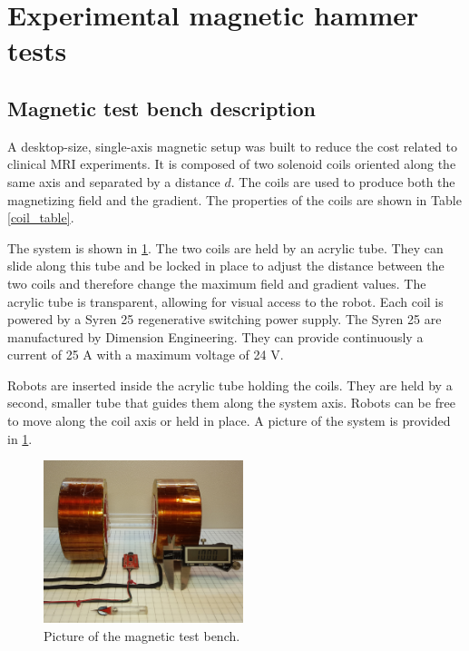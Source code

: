 \documentclass[letterpaper, 10 pt, conference]{ieeeconf}  %
\begin{document}
\section{Experimental magnetic hammer tests}
\label{experiment}
\subsection{Magnetic test bench description}

A desktop-size, single-axis magnetic setup was built to reduce the cost related to clinical MRI experiments.
 It is composed of two solenoid coils oriented along the same axis and separated by a distance $d$. 
 The coils are used to produce both the magnetizing field and the gradient. 
 The properties of the coils are shown in Table \ref{coil_table}.\par
The system is shown in \cref{magnetic_setup}.
 The two coils are held by an acrylic tube. 
 They can slide along this tube and be locked in place to adjust the distance between the two coils and therefore change the maximum field and gradient values. 
 The acrylic tube is transparent, allowing for visual access to the robot.
Each coil is powered by a Syren 25 regenerative switching power supply. The Syren 25 are manufactured by Dimension Engineering. They can provide continuously a current of 25 A with a maximum voltage of 24 V.\par
Robots are inserted inside the acrylic tube holding the coils. 
They are held by a second, smaller tube that guides them along the system axis. 
Robots can be free to move along the coil axis or held in place. 
A picture of the system is provided in \cref{magnetic_setup}.

\begin{figure}
	\begin{centering}
  \includegraphics[width=165pt]{Magnetic_test_bench.jpg}
  \caption{Picture of the magnetic test bench.}
  \label{magnetic_setup}
	\end{centering}
	\vspace{-0.5em}
\end{figure}
\end{document}
